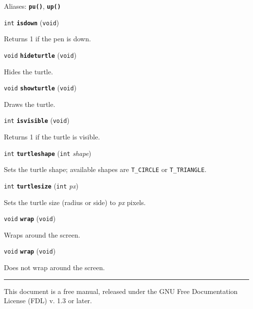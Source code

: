 \documentclass[a4paper,11pt]{article}
\newcommand{\V}{\texttt{void}}      %
\newcommand{\I}{\texttt{int}}       %
\newcommand{\func}[1]{\textbf{\texttt{#1}}}  %
\newcommand{\A}[1]{\emph{#1}}       %
\newcommand{\T}[1]{\texttt{#1}}     %
\newenvironment{bgi}
{ %
  \begin{snugshade}
}
{ %
  \end{snugshade}
}
\begin{document}
Aliases: \func{pu()}, \func{up()}


\begin{bgi}
\I{} \func{isdown} (\V{})
\end{bgi}

Returns 1 if the pen is down.


\begin{bgi}
\V{} \func{hideturtle} (\V{})
\end{bgi}

Hides the turtle.


\begin{bgi}
\V{} \func{showturtle} (\V{})
\end{bgi}

Draws the turtle.


\begin{bgi}
\I{} \func{isvisible} (\V{})
\end{bgi}

Returns 1 if the turtle is visible.


\begin{bgi}
\I{} \func{turtleshape} (\I{} \A{shape})
\end{bgi}

Sets the turtle shape; available shapes are \T{T\_CIRCLE} or
\T{T\_TRIANGLE}.


\begin{bgi}
\I{} \func{turtlesize} (\I{} \A{px})
\end{bgi}

Sets the turtle size (radius or side) to \A{px} pixels.


\begin{bgi}
\V{} \func{wrap} (\V{})
\end{bgi}

Wraps around the screen.


\begin{bgi}
\V{} \func{wrap} (\V{})
\end{bgi}

Does not wrap around the screen.


\bigskip

\rule{\linewidth}{0.2pt}

This document is a free manual, released under the GNU Free
Documentation License (FDL) v. 1.3 or later.
\end{document}
